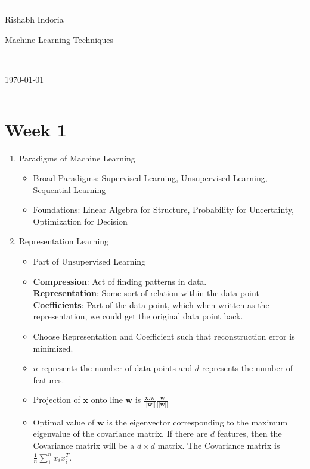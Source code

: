 \documentclass[a4paper]{article}
\begin{document}
\fancyhead[c]{}
\hrule \medskip
\begin{minipage}{0.295\textwidth}
\raggedright
Rishabh Indoria
\end{minipage}
\begin{minipage}{0.4\textwidth}
\centering
\LARGE
Machine Learning Techniques
\end{minipage}\
\begin{minipage}{0.295\textwidth}
\raggedleft
\today \hfill \\
\end{minipage}
\medskip \hrule
\bigskip

\section{Week 1}
\begin{enumerate}
    \item{Paradigms of Machine Learning}
    \begin{itemize}
        \item Broad Paradigms: Supervised Learning, Unsupervised Learning, Sequential Learning
        \item Foundations: Linear Algebra for Structure, Probability for Uncertainty, Optimization for Decision
    \end{itemize}
    \item{Representation Learning}
    \begin{itemize}
        \item Part of Unsupervised Learning
        \item \textbf{Compression}: Act of finding patterns in data.\\
        \textbf{Representation}: Some sort of relation within the data point\\
        \textbf{Coefficients}: Part of the data point, which when written as the representation, we could get the original data point back.
        \item Choose Representation and Coefficient such that reconstruction error is minimized.
        \item $n$ represents the number of data points and $d$ represents the number of features.
        \item Projection of $\textbf{x}$ onto line $\textbf{w}$ is $\frac{\textbf{x.w}}{||\textbf{w}||}\frac{\textbf{w}}{||\textbf{w}||}$
        \item Optimal value of $\textbf{w}$ is the eigenvector corresponding to the maximum eigenvalue of the covariance matrix. If there are $d$ features, then the Covariance matrix will be a $d\times d$ matrix. The Covariance matrix is $\frac{1}{n}\sum_1^nx_ix_i^T$.

\end{itemize}
\end{enumerate}
\end{document}
